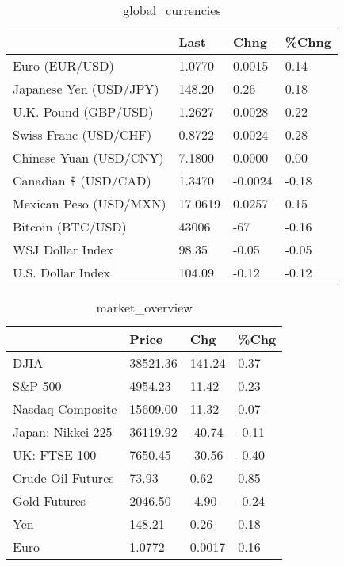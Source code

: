 \documentclass{article}%
\begin{document}
%


\begin{table}[htbp]%
\caption{global\_currencies}%
\centering%
\begin{adjustbox}{width=1\textwidth}%
\begin{tabular}{llll}
\toprule
                       &    Last &    Chng & \%Chng \\
\midrule
        Euro (EUR/USD) &  1.0770 &  0.0015 &  0.14 \\
Japanese Yen (USD/JPY) &  148.20 &    0.26 &  0.18 \\
  U.K. Pound (GBP/USD) &  1.2627 &  0.0028 &  0.22 \\
 Swiss Franc (USD/CHF) &  0.8722 &  0.0024 &  0.28 \\
Chinese Yuan (USD/CNY) &  7.1800 &  0.0000 &  0.00 \\
  Canadian \$ (USD/CAD) &  1.3470 & -0.0024 & -0.18 \\
Mexican Peso (USD/MXN) & 17.0619 &  0.0257 &  0.15 \\
     Bitcoin (BTC/USD) &   43006 &     -67 & -0.16 \\
      WSJ Dollar Index &   98.35 &   -0.05 & -0.05 \\
     U.S. Dollar Index &  104.09 &   -0.12 & -0.12 \\
\bottomrule
\end{tabular}
%
\end{adjustbox}%
\end{table}

%


\begin{table}[htbp]%
\caption{market\_overview}%
\centering%
\begin{adjustbox}{width=1\textwidth}%
\begin{tabular}{llll}
\toprule
                  &    Price &    Chg &  \%Chg \\
\midrule
             DJIA & 38521.36 & 141.24 &  0.37 \\
          S\&P 500 &  4954.23 &  11.42 &  0.23 \\
 Nasdaq Composite & 15609.00 &  11.32 &  0.07 \\
Japan: Nikkei 225 & 36119.92 & -40.74 & -0.11 \\
     UK: FTSE 100 &  7650.45 & -30.56 & -0.40 \\
Crude Oil Futures &    73.93 &   0.62 &  0.85 \\
     Gold Futures &  2046.50 &  -4.90 & -0.24 \\
              Yen &   148.21 &   0.26 &  0.18 \\
             Euro &   1.0772 & 0.0017 &  0.16 \\
\bottomrule
\end{tabular}
%
\end{adjustbox}%
\end{table}

%
\end{document}
